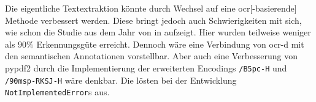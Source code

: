 Die eigentliche Textextraktion 
könnte durch Wechsel auf eine \gls{ocr}[-basierende] Methode
verbessert werden.
Diese bringt jedoch auch Schwierigkeiten mit sich, 
wie schon die Studie  aus dem Jahr \citeyear{SBB:OCRStudie}
von \citeauthor{SBB:OCRStudie} in \autocite[6.2]{SBB:OCRStudie} aufzeigt.
Hier wurden teilweise weniger als \(90\%\) Erkennungsgüte erreicht.
Dennoch wäre eine Verbindung von \gls{ocr-d} mit den semantischen Annotationen
vorstellbar.
Aber auch eine Verbesserung von \gls{pypdf2}
durch die Implementierung der erweiterten Encodings \texttt{/B5pc-H} und \texttt{/90msp-RKSJ-H} 
wäre denkbar.
Die lösten bei der Entwicklung \texttt{NotImplementedError}s aus.   